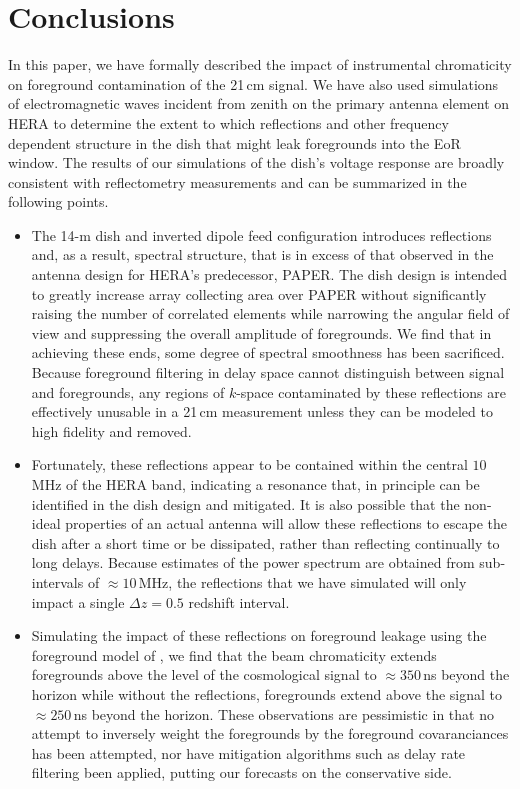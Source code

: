 \documentclass[twocolumn]{emulateapj}
\begin{document}
\section{Conclusions}\label{sec:Conclusion}
In this paper, we have formally described the impact of instrumental chromaticity on foreground contamination of the 21\,cm signal. We have also used simulations of electromagnetic waves incident from zenith on the primary antenna element on HERA to determine the extent to which reflections and other frequency dependent structure in the dish that might leak foregrounds into the EoR window. The results of our simulations of the dish's voltage response are broadly consistent with reflectometry measurements \citep{Patra:2016} and can be summarized in the following points. 
\begin{itemize}
\item The 14-m dish and inverted dipole feed configuration introduces reflections and, as a result, spectral structure, that is in excess of that observed in the antenna design for HERA's predecessor, PAPER. The dish design is intended to greatly increase array collecting area over PAPER without significantly raising the number of correlated elements while narrowing the angular field of view and suppressing the overall amplitude of foregrounds. We find that in achieving these ends, some degree of spectral smoothness has been sacrificed. Because foreground filtering in delay space cannot distinguish between signal and foregrounds, any regions of $k$-space contaminated by these reflections are effectively unusable in a 21\,cm measurement unless they can be modeled to high fidelity and removed. 

\item Fortunately, these reflections appear to be contained within the central $10$\,MHz of the HERA band, indicating a resonance that, in principle can be identified in the dish design and mitigated. It is also possible that the  non-ideal properties of an actual antenna will allow these reflections to escape the dish after a short time or be dissipated, rather than reflecting continually to long delays. Because estimates of the power spectrum are obtained from sub-intervals of $\approx10$\,MHz, the reflections that we have simulated will only impact a single $\Delta z=0.5$ redshift interval.

\item Simulating the impact of these reflections on foreground leakage using the foreground model of \citet{Thyagarajan:2016}, we find that the beam chromaticity extends foregrounds above the level of the cosmological signal to $\approx 350$\,ns beyond the horizon while without the reflections, foregrounds extend above the signal to $\approx 250$\,ns beyond the horizon. These observations are pessimistic in that no attempt to inversely weight the foregrounds by the foreground covaranciances has been attempted, nor have mitigation algorithms such as delay rate filtering been applied, putting our forecasts on the conservative side. 


\end{itemize}
\end{document}
